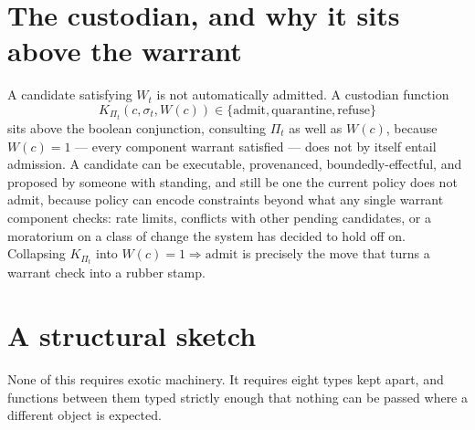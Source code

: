 \documentclass[11pt,openany]{book}
\begin{document}
\section{The custodian, and why it sits above the warrant}

A candidate satisfying $W_t$ is not automatically admitted. A custodian function
\[
K_{\Pi_t}(c, \sigma_t, W(c)) \in \{\mathrm{admit}, \mathrm{quarantine}, \mathrm{refuse}\}
\]
sits above the boolean conjunction, consulting $\Pi_t$ as well as $W(c)$, because $W(c) = 1$ — every component warrant satisfied — does not by itself entail admission. A candidate can be executable, provenanced, boundedly-effectful, and proposed by someone with standing, and still be one the current policy does not admit, because policy can encode constraints beyond what any single warrant component checks: rate limits, conflicts with other pending candidates, or a moratorium on a class of change the system has decided to hold off on. Collapsing $K_{\Pi_t}$ into $W(c) = 1 \Rightarrow \mathrm{admit}$ is precisely the move that turns a warrant check into a rubber stamp.

\section{A structural sketch}

None of this requires exotic machinery. It requires eight types kept apart, and functions between them typed strictly enough that nothing can be passed where a different object is expected.
\end{document}
